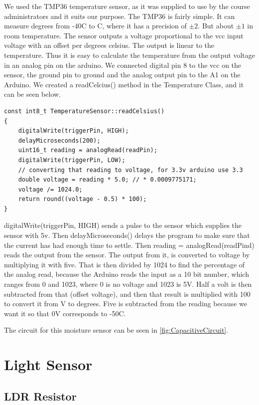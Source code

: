 \documentclass[a4paper,12pt,oneside,openright,titlepage]{book}
\begin{document}
We used the TMP36 temperature sensor, as it was supplied to use by the course administrators and it suits our purpose. The TMP36 is fairly simple. It can measure degrees from -40\textdegree{}C to C, where it has a precision\cite{tmpTutorial} of $\pm2$. But about $\pm1$ in room temperature. The sensor outputs a voltage proportional to the vcc input voltage with an offset per degrees celsius. The output is linear to the temperature. Thus it is easy to calculate the temperature from the output voltage in an analog pin on the arduino.
We connected digital pin 8 to the vcc on the sensor, the ground pin to ground and the analog output pin to the A1 on the Arduino.
We created a readCelcius() method in the Temperature Class, and it can be seen below.
\begin{lstlisting}[language=Arduino]
const int8_t TemperatureSensor::readCelsius()
{
    digitalWrite(triggerPin, HIGH);
    delayMicroseconds(200);
    uint16_t reading = analogRead(readPin);
    digitalWrite(triggerPin, LOW);
    // converting that reading to voltage, for 3.3v arduino use 3.3
    double voltage = reading * 5.0; // * 0.0009775171;
    voltage /= 1024.0;
    return round((voltage - 0.5) * 100);
}
\end{lstlisting}
digitalWrite(triggerPin, HIGH) sends a pulse to the sensor which supplies the sensor with 5v. Then delayMicroseconds() delays the program to make sure that the current has had enough time to settle. Then reading = analogRead(readPind) reads the output from the sensor. The output from it, is converted to voltage by multiplying it with five. That is then divided by 1024 to find the percentage of the analog read, because the Arduino reads the input as a 10 bit number, which ranges from 0 and 1023, where 0 is no voltage and 1023 is 5V. Half a volt is then subtracted from that (offset voltage), and then that result is multiplied with 100 to convert it from V to degrees. Five is subtracted from the reading because we want it so that 0V corresponds to -50\textdegree{}C. 

The circuit for this moisture sensor can be seen in \ref{fig:CapacitiveCircuit}.
\section{Light Sensor}
\subsection{LDR Resistor}
\end{document}
